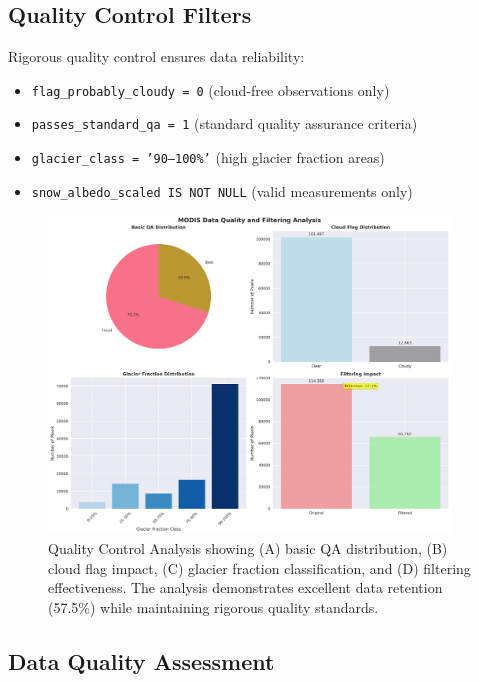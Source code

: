 \documentclass[12pt,a4paper]{article}
\begin{document}
\subsection{Quality Control Filters}

Rigorous quality control ensures data reliability:
\begin{itemize}
    \item \texttt{flag\_probably\_cloudy = 0} (cloud-free observations only)
    \item \texttt{passes\_standard\_qa = 1} (standard quality assurance criteria)
    \item \texttt{glacier\_class = '90--100\%'} (high glacier fraction areas)
    \item \texttt{snow\_albedo\_scaled IS NOT NULL} (valid measurements only)
\end{itemize}

\begin{figure}[H]
\centering
\includegraphics[width=0.95\textwidth]{../../results/plots/qa_quality_analysis.png}
\caption{Quality Control Analysis showing (A) basic QA distribution, (B) cloud flag impact, (C) glacier fraction classification, and (D) filtering effectiveness. The analysis demonstrates excellent data retention (57.5\%) while maintaining rigorous quality standards.}
\label{fig:qa_analysis}
\end{figure}

\subsection{Data Quality Assessment}
\end{document}
